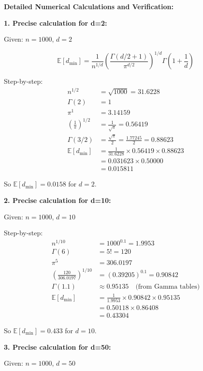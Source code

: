 \documentclass[12pt]{article}
\begin{document}
\begin{computation}
\textbf{Detailed Numerical Calculations and Verification:}

\textbf{1. Precise calculation for d=2:}

Given: \(n = 1000\), \(d = 2\)

\[
\mathbb{E}[d_{\min}] = \frac{1}{n^{1/d}} \left(\frac{\Gamma(d/2 + 1)}{\pi^{d/2}}\right)^{1/d} \Gamma\left(1 + \frac{1}{d}\right)
\]

Step-by-step:
\begin{align*}
n^{1/2} &= \sqrt{1000} = 31.6228 \\
\Gamma(2) &= 1 \\
\pi^1 &= 3.14159 \\
\left(\frac{1}{\pi}\right)^{1/2} &= \frac{1}{\sqrt{\pi}} = 0.56419 \\
\Gamma(3/2) &= \frac{\sqrt{\pi}}{2} = \frac{1.77245}{2} = 0.88623 \\
\mathbb{E}[d_{\min}] &= \frac{1}{31.6228} \times 0.56419 \times 0.88623 \\
&= 0.031623 \times 0.50000 \\
&= 0.015811
\end{align*}

So \(\boxed{\mathbb{E}[d_{\min}] = 0.0158}\) for \(d=2\).

\textbf{2. Precise calculation for d=10:}

Given: \(n = 1000\), \(d = 10\)

Step-by-step:
\begin{align*}
n^{1/10} &= 1000^{0.1} = 1.9953 \\
\Gamma(6) &= 5! = 120 \\
\pi^5 &= 306.0197 \\
\left(\frac{120}{306.0197}\right)^{1/10} &= (0.39205)^{0.1} = 0.90842 \\
\Gamma(1.1) &\approx 0.95135 \quad \text{(from Gamma tables)} \\
\mathbb{E}[d_{\min}] &= \frac{1}{1.9953} \times 0.90842 \times 0.95135 \\
&= 0.50118 \times 0.86408 \\
&= 0.43304
\end{align*}

So \(\boxed{\mathbb{E}[d_{\min}] = 0.433}\) for \(d=10\).

\textbf{3. Precise calculation for d=50:}

Given: \(n = 1000\), \(d = 50\)


\end{computation}
\end{document}

